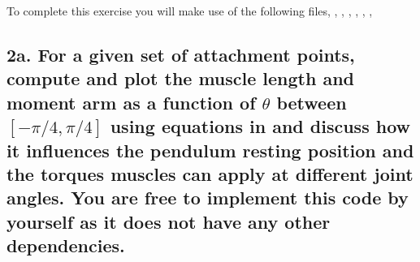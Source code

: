\documentclass{cmc}
\begin{document}
To complete this exercise you will make use of the following files,
, ,
, , ,
,  %
\clearpage

\label{sec:questions}

\subsection*{2a. For a given set of attachment points, compute and
  plot the muscle length and moment arm as a function of $\theta$
  between $[-\pi/4, \pi/4]$ using equations in 
  and discuss how it influences the pendulum resting position and the
  torques muscles can apply at different joint angles. You are free to implement
this code by yourself as it does not have any other dependencies.}
\label{sec:2a}
\end{document}
